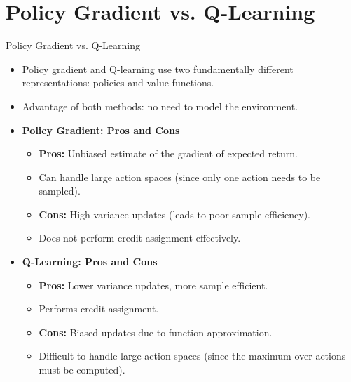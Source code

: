 \section{Policy Gradient vs. Q-Learning}
\begin{frame}{Policy Gradient vs. Q-Learning}
\begin{itemize}
    \item Policy gradient and Q-learning use two fundamentally different representations: policies and value functions.
    \item Advantage of both methods: no need to model the environment.
    \pause
    \item \textbf{Policy Gradient: Pros and Cons}
    \begin{itemize}
        \setlength{\itemsep}{-0.25em}
        \item \textbf{Pros:} Unbiased estimate of the gradient of expected return.
        \item Can handle large action spaces (since only one action needs to be sampled).
        \item \textbf{Cons:} High variance updates (leads to poor sample efficiency).
        \item Does not perform credit assignment effectively.
    \end{itemize}
    \pause
    \item \textbf{Q-Learning: Pros and Cons}
    \begin{itemize}
        \setlength{\itemsep}{-0.25em}
        \item \textbf{Pros:} Lower variance updates, more sample efficient.
        \item Performs credit assignment.
        \item \textbf{Cons:} Biased updates due to function approximation.
        \item Difficult to handle large action spaces (since the maximum over actions must be computed).
    \end{itemize}
\end{itemize}
\end{frame}
